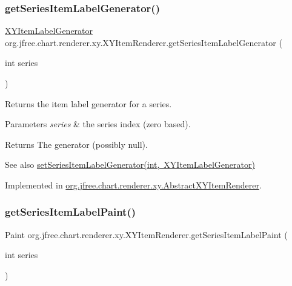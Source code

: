 \subsubsection{\texorpdfstring{get\+Series\+Item\+Label\+Generator()}{getSeriesItemLabelGenerator()}}
{\footnotesize\ttfamily \mbox{\hyperlink{interfaceorg_1_1jfree_1_1chart_1_1labels_1_1_x_y_item_label_generator}{X\+Y\+Item\+Label\+Generator}} org.\+jfree.\+chart.\+renderer.\+xy.\+X\+Y\+Item\+Renderer.\+get\+Series\+Item\+Label\+Generator (\begin{DoxyParamCaption}\item[{int}]{series }\end{DoxyParamCaption})}

Returns the item label generator for a series.


\begin{DoxyParams}{Parameters}
{\em series} & the series index (zero based).\\
\hline
\end{DoxyParams}
\begin{DoxyReturn}{Returns}
The generator (possibly {\ttfamily null}).
\end{DoxyReturn}
\begin{DoxySeeAlso}{See also}
\mbox{\hyperlink{interfaceorg_1_1jfree_1_1chart_1_1renderer_1_1xy_1_1_x_y_item_renderer_a8887feead656e9b57ce1bb2847c1421c}{set\+Series\+Item\+Label\+Generator(int, X\+Y\+Item\+Label\+Generator)}} 
\end{DoxySeeAlso}


Implemented in \mbox{\hyperlink{classorg_1_1jfree_1_1chart_1_1renderer_1_1xy_1_1_abstract_x_y_item_renderer_a84c79d82b5bc9b856836ca5166a71b41}{org.\+jfree.\+chart.\+renderer.\+xy.\+Abstract\+X\+Y\+Item\+Renderer}}.

\mbox{\label{interfaceorg_1_1jfree_1_1chart_1_1renderer_1_1xy_1_1_x_y_item_renderer_a4de36c3b8a459d72af75f20f253be2cd}} 
\subsubsection{\texorpdfstring{get\+Series\+Item\+Label\+Paint()}{getSeriesItemLabelPaint()}}
{\footnotesize\ttfamily Paint org.\+jfree.\+chart.\+renderer.\+xy.\+X\+Y\+Item\+Renderer.\+get\+Series\+Item\+Label\+Paint (\begin{DoxyParamCaption}\item[{int}]{series }\end{DoxyParamCaption})}

